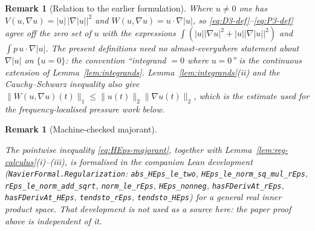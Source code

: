 \documentclass[11pt]{article}
\newtheorem{remark}[theorem]{Remark}
\theoremstyle{definition}
\theoremstyle{plain}
\newcommand{\norm}[1]{\lVert #1\rVert}
\begin{document}
\begin{remark}[Relation to the earlier formulation]\label{rem:old-form}
Where $u\neq0$ one has $V(u,\nabla u)=|u|\,|\nabla|u||^2$ and
$W(u,\nabla u)=u\cdot\nabla|u|$, so \eqref{eq:D3-def}--\eqref{eq:P3-def}
agree off the zero set of $u$ with the expressions
$\int(|u||\nabla u|^2+|u||\nabla|u||^2)$ and $\int p\,u\cdot\nabla|u|$.
The present definitions need no almost-everywhere statement about
$\nabla|u|$ on $\{u=0\}$: the convention ``integrand $=0$ where $u=0$'' is
the continuous extension of Lemma~\ref{lem:integrands}.
Lemma~\ref{lem:integrands}(ii) and the Cauchy--Schwarz inequality also give
$\norm{W(u,\nabla u)(t)}_1\leq\norm{u(t)}_2\norm{\nabla u(t)}_2$, which is
the estimate used for the frequency-localised pressure work below.
\end{remark}

\begin{remark}[Machine-checked majorant]\label{rem:lean-majorant}
\begin{sloppypar}
The pointwise inequality \eqref{eq:HEps-majorant}, together with
Lemma~\ref{lem:reg-calculus}(i)--\allowbreak(iii), is formalised in the
companion Lean
development (\texttt{NavierFormal.\allowbreak Regularization}:
\texttt{abs\_\allowbreak HEps\_\allowbreak le\_\allowbreak two},
\texttt{HEps\_\allowbreak le\_\allowbreak norm\_\allowbreak sq\_\allowbreak mul\_\allowbreak rEps},
\texttt{rEps\_\allowbreak le\_\allowbreak norm\_\allowbreak add\_\allowbreak sqrt},
\texttt{norm\_\allowbreak le\_\allowbreak rEps}, \texttt{HEps\_\allowbreak nonneg},
\texttt{hasFDerivAt\_\allowbreak rEps},
\texttt{hasFDerivAt\_\allowbreak HEps}, \texttt{tendsto\_\allowbreak rEps},
\texttt{tendsto\_\allowbreak HEps})
for a general real inner product space.  That development is not used as a
source here: the paper proof above is independent of it.
\end{sloppypar}
\end{remark}
\end{document}
